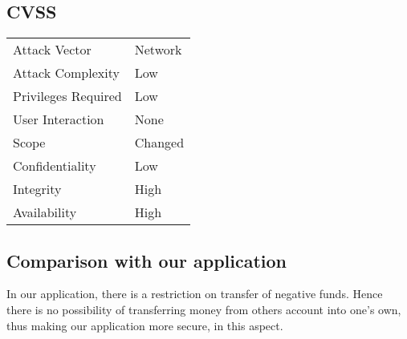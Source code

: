 \subsection{CVSS}
\begin{tabular}{l | l}
Attack Vector		& Network \\
Attack Complexity	& Low \\
Privileges Required & Low \\
User Interaction	& None \\
Scope				& Changed \\
Confidentiality		& Low \\
Integrity			& High \\
Availability		& High
\end{tabular}

\subsection{Comparison with our application}
In our application, there is a restriction on transfer of negative funds. Hence there is no possibility of transferring money from others account into one's own, thus making our application more secure, in this aspect.
\clearpage
